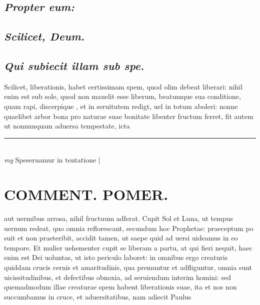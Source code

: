 \documentclass{article}
\begin{document}
\begin{pages}
\subsection*{\textit{Propter eum: }}
{}
\subsection*{\textit{Scilicet, Deum.  }}
{}
\subsection*{\textit{Qui subiecit illam sub spe. }}\pstart Scilicet, liberationis, habet certissimam spem, quod olim debeat liberari: nihil enim est sub sole, quod non mauelit esse liberum, beatumque sua conditione, quam rapi, discerpique , et in seruitutem redigt, uel in totum aboleri: nonne quaelibet arbor bona pro naturae suae bonitate libenter fructum ferret, fit autem ut nonnunquam aduersa tempestate, icta  \pend
\vspace{0.5cm}\noindent
\vspace{0.2cm}\rule{1cm}{0.2pt}\\ 
\hspace{0.2cm}\textit{mg}
\footnotesize Speseruamur in tentatione 
\normalsize| 
\section*{COMMENT. POMER.  }\pstart aut uermibus arrosa, nihil fructuum adferat. Cupit Sol et Luna, ut tempus uernum redeat, quo omnia reflorescant, secundum hoc Prophetae: praeceptum po suit et non praeteribit, accidit tamen, ut saepe quid ad uersi uideamus in eo tempore. Et mulier uehementer cupit se liberam a partu, at qui fieri nequit, haec enim est Dei uoluntas, ut isto periculo laboret: in omnibus ergo creaturis quiddam crucis cernis et amaritudinis, qua premuntur et adfliguntur, omnia sunt uicissitudinibus, et defectibus obnoxia, ad seruiendum interim homini: sed quemadmodum illae creaturae spem habent liberationis suae, ita et nos non succumbamus in cruce, et aduersitatibus, nam adiecit Paulus  \pend
{}
{}

\end{pages}
\end{document}
